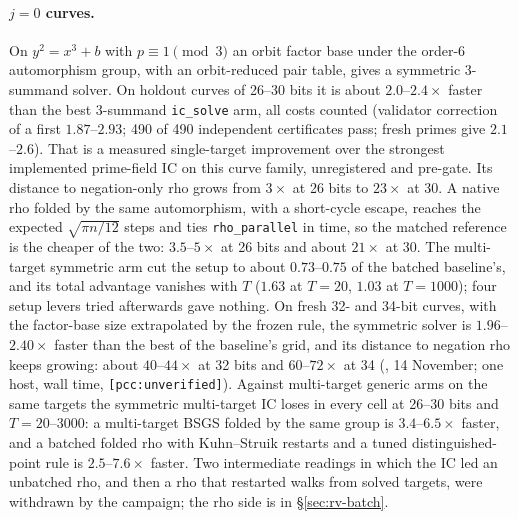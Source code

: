 \paragraph{$j=0$ curves.} On $y^2=x^3+b$ with $p\equiv1\pmod3$ an orbit factor
base under the order-6 automorphism group, with an orbit-reduced pair table,
gives a symmetric 3-summand solver. On holdout curves of 26--30 bits it is about
$2.0$--$2.4\times$ faster than the best 3-summand \texttt{ic\_solve} arm, all
costs counted (validator correction of a first $1.87$--$2.93$; 490 of 490
independent certificates pass; fresh primes give $2.1$--$2.6$). That is a
measured single-target improvement over the strongest implemented
prime-field IC on this curve family, unregistered and pre-gate. Its distance
to negation-only rho grows from $3\times$ at 26 bits to $23\times$ at 30. A
native rho folded by the same automorphism, with a short-cycle escape,
reaches the expected $\sqrt{\pi n/12}$ steps and ties \texttt{rho\_parallel}
in time, so the matched reference is the cheaper of the two: $3.5$--$5\times$
at 26 bits and about $21\times$ at 30. The multi-target symmetric arm cut the
setup to about $0.73$--$0.75$ of the batched baseline's, and its total
advantage vanishes with $T$ ($1.63$ at $T=20$, $1.03$ at $T=1000$); four
setup levers tried afterwards gave nothing. On fresh 32- and 34-bit curves, with the
factor-base size extrapolated by the frozen rule, the symmetric solver is
$1.96$--$2.40\times$ faster than the best of the baseline's grid, and its
distance to negation rho keeps growing: about $40$--$44\times$ at 32 bits and
$60$--$72\times$ at 34 (,
14 November; one host, wall time, \texttt{[pcc:unverified]}). Against
multi-target generic arms on the same targets the symmetric multi-target IC
loses in every cell at 26--30 bits and $T=20$--3000: a multi-target BSGS
folded by the same group is $3.4$--$6.5\times$ faster, and a batched folded
rho with Kuhn--Struik restarts and a tuned distinguished-point rule is
$2.5$--$7.6\times$ faster. Two intermediate readings in which the IC led an
unbatched rho, and then a rho that restarted walks from solved targets,
were withdrawn by the campaign; the rho side is in \S\ref{sec:rv-batch}.

